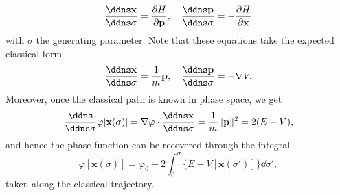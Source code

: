 \documentclass[a4paper,10pt]{paper}
\begin{document}
\begin{enumerate}
\begin{equation*}
    \frac{\ddns\mathbf{x}}{\ddns\sigma}=\frac{\partial H}{\partial \mathbf{p}}, \quad \frac{\ddns\mathbf{p}}{\ddns\sigma}=-\frac{\partial H}{\partial \mathbf{x}}
\end{equation*}
with $\sigma$ the generating parameter. Note that these equations take the expected classical form
\begin{equation*}
    \frac{\ddns\mathbf{x}}{\ddns\sigma}=\frac{1}{m}\mathbf{p},\quad \frac{\ddns\mathbf{p}}{\ddns\sigma}=-\nabla V.
\end{equation*}
Moreover, once the classical path is known in phase space, we get
\begin{equation*}
    \frac{\ddns}{\ddns\sigma}\varphi[\mathbf{x}(\sigma)]=\nabla\varphi\cdot\frac{\ddns\mathbf{x}}{\ddns\sigma}=\frac{1}{m}\|\mathbf{p}\|^{2}=2(E-V),
\end{equation*}
and hence the phase function can be recovered through the integral
\begin{equation*}
    \varphi[\mathbf{x}(\sigma)]=\varphi_{0}+2\int_{0}^{\sigma}\{E-V[\mathbf{x}(\sigma')]\}\dd\sigma',
\end{equation*}
taken along the classical trajectory.


\end{enumerate}
\end{document}
